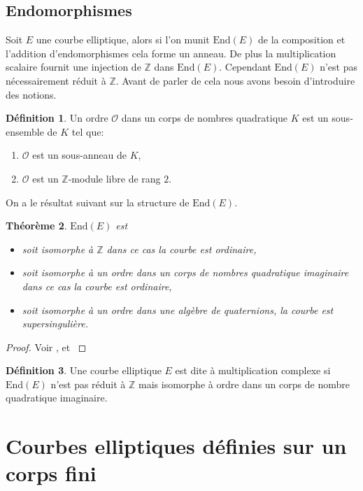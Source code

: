 \documentclass[10pt,a4paper]{book}
\theoremstyle{plain}
\newtheorem{thm}{Théorème}[chapter]
\theoremstyle{definition}
\theoremstyle{definition}
\theoremstyle{definition}
\theoremstyle{definition}
\theoremstyle{definition}
\newtheorem{defi}[thm]{Définition}
\theoremstyle{remark}
\theoremstyle{remark}
\theoremstyle{definition}
\begin{document}
\subsection{Endomorphismes}

Soit $E$ une courbe elliptique, alors si l'on munit $\mathrm{End}(E)$ de la 
composition et l'addition d'endomorphismes cela forme un anneau. De plus la
multiplication scalaire fournit une injection de $\mathbb{Z}$ dans 
$\mathrm{End}(E)$. Cependant $\mathrm{End}(E)$ n'est pas nécessairement réduit 
à $\mathbb{Z}$. Avant de parler de cela nous avons besoin d'introduire des 
notions.

\begin{defi}
Un ordre $\mathcal{O}$ dans un corps de nombres quadratique $K$ est un 
sous-ensemble de $K$ tel que:
\begin{enumerate}
\item $\mathcal{O}$ est un sous-anneau de $K$,
\item $\mathcal{O}$ est un $\mathbb{Z}$-module libre de rang $2$.
\end{enumerate}
\end{defi}

On a le résultat suivant sur la structure de $\mathrm{End}(E)$.

\begin{thm}
$\mathrm{End}(E)$ est
\begin{itemize}
\item soit isomorphe à $\mathbb{Z}$ dans ce cas la courbe est \emph{ordinaire}, 
\item soit isomorphe à un ordre dans un corps de nombres quadratique imaginaire
dans ce cas la courbe est \emph{ordinaire}, 
\item soit isomorphe à un ordre dans une algèbre de quaternions, la courbe est \emph{supersingulière}. 
\end{itemize}
\end{thm}

\begin{proof}
Voir \cite[Corollary III.9.4]{Silv1}, et \cite[Theorem V.3.1]{Silv1}
\end{proof}

\begin{defi}
\label{def:mul:comp}
Une courbe elliptique $E$ est dite à multiplication complexe si 
$\mathrm{End}(E)$ n'est pas réduit à $\mathbb{Z}$ mais isomorphe à ordre dans 
un corps de nombre quadratique imaginaire. 
\end{defi}

\section{Courbes elliptiques définies sur un corps fini}
\end{document}
